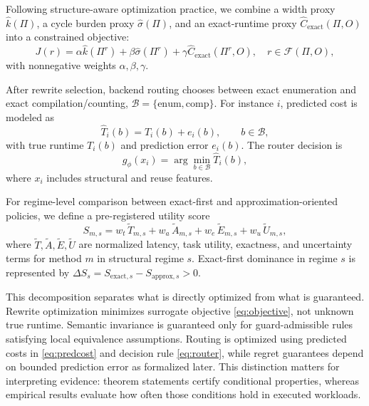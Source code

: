 \documentclass{article} %
\begin{document}
Following structure-aware optimization practice, we combine a width proxy $\widehat{k}(\Pi)$, a cycle burden proxy $\widehat{\sigma}(\Pi)$, and an exact-runtime proxy $\widehat{C}_{\text{exact}}(\Pi,O)$ into a constrained objective:
\begin{equation}
\label{eq:objective}
J(r)=\alpha\widehat{k}(\Pi^r)+\beta\widehat{\sigma}(\Pi^r)+\gamma\widehat{C}_{\text{exact}}(\Pi^r,O),\quad r\in\mathcal{F}(\Pi,O),
\end{equation}
with nonnegative weights $\alpha,\beta,\gamma$.

After rewrite selection, backend routing chooses between exact enumeration and exact compilation/counting, $\mathcal{B}=\{\text{enum},\text{comp}\}$. For instance $i$, predicted cost is modeled as
\begin{equation}
\label{eq:predcost}
\widehat{T}_i(b)=T_i(b)+e_i(b),\qquad b\in\mathcal{B},
\end{equation}
with true runtime $T_i(b)$ and prediction error $e_i(b)$. The router decision is
\begin{equation}
\label{eq:router}
g_{\phi}(x_i)=\arg\min_{b\in\mathcal{B}}\widehat{T}_i(b),
\end{equation}
where $x_i$ includes structural and reuse features.

For regime-level comparison between exact-first and approximation-oriented policies, we define a pre-registered utility score
\begin{equation}
\label{eq:score}
S_{m,s}=w_t\,\widetilde{T}_{m,s}+w_a\,\widetilde{A}_{m,s}+w_e\,\widetilde{E}_{m,s}+w_u\,\widetilde{U}_{m,s},
\end{equation}
where $\widetilde{T},\widetilde{A},\widetilde{E},\widetilde{U}$ are normalized latency, task utility, exactness, and uncertainty terms for method $m$ in structural regime $s$. Exact-first dominance in regime $s$ is represented by $\Delta S_s=S_{\text{exact},s}-S_{\text{approx},s}>0$.

This decomposition separates what is directly optimized from what is guaranteed. Rewrite optimization minimizes surrogate objective \eqref{eq:objective}, not unknown true runtime. Semantic invariance is guaranteed only for guard-admissible rules satisfying local equivalence assumptions. Routing is optimized using predicted costs in \eqref{eq:predcost} and decision rule \eqref{eq:router}, while regret guarantees depend on bounded prediction error as formalized later. This distinction matters for interpreting evidence: theorem statements certify conditional properties, whereas empirical results evaluate how often those conditions hold in executed workloads.
\end{document}
